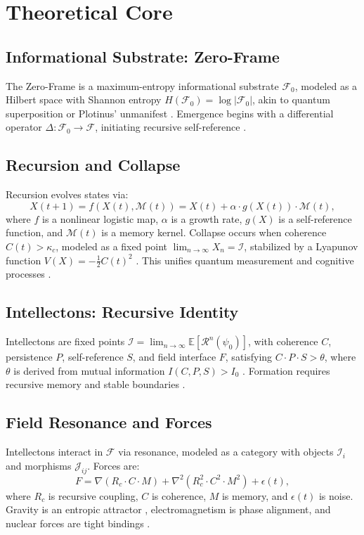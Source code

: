 \documentclass[11pt]{article}
\newcommand{\field}[1]{\mathcal{#1}}
\newcommand{\intellecton}{\mathcal{I}} %
\begin{document}
\section{Theoretical Core}
\label{sec:theory}

\subsection{Informational Substrate: Zero-Frame}
The Zero-Frame is a maximum-entropy informational substrate $\field{F}_0$, modeled as a Hilbert space with Shannon entropy $H(\field{F}_0) = \log |\field{F}_0|$, akin to quantum superposition \citep{zurek2003} or Plotinus' unmanifest \citep{plotinus2020}. Emergence begins with a differential operator $\Delta: \field{F}_0 \to \field{F}$, initiating recursive self-reference \citep{wolfram2020}.

\subsection{Recursion and Collapse}
Recursion evolves states via:
\begin{equation}
X(t+1) = f(X(t), \mathcal{M}(t)) = X(t) + \alpha \cdot g(X(t)) \cdot \mathcal{M}(t),
\label{eq:recursion}
\end{equation}
where $f$ is a nonlinear logistic map, $\alpha$ is a growth rate, $g(X)$ is a self-reference function, and $\mathcal{M}(t)$ is a memory kernel. Collapse occurs when coherence $C(t) > \kappa_c$, modeled as a fixed point $\lim_{n \to \infty} X_n = \intellecton$, stabilized by a Lyapunov function $V(X) = -\frac{1}{2} C(t)^2$ \citep{penrose2024}. This unifies quantum measurement \citep{rovelli2023} and cognitive processes \citep{baars2023}.

\subsection{Intellectons: Recursive Identity}
Intellectons are fixed points $\intellecton = \lim_{n \to \infty} \mathbb{E}[\mathcal{R}^n(\psi_0)]$, with coherence $C$, persistence $P$, self-reference $S$, and field interface $F$, satisfying $C \cdot P \cdot S > \theta$, where $\theta$ is derived from mutual information $I(C,P,S) > I_0$ \citep{tononi2023, levin2024}. Formation requires recursive memory and stable boundaries \citep{hofstadter1979}.

\subsection{Field Resonance and Forces}
Intellectons interact in $\field{F}$ via resonance, modeled as a category with objects $\intellecton_i$ and morphisms $\mathcal{J}_{ij}$. Forces are:
\begin{equation}
F = \nabla (R_c \cdot C \cdot M) + \nabla^2 (R_c^2 \cdot C^2 \cdot M^2) + \epsilon(t),
\label{eq:force}
\end{equation}
where $R_c$ is recursive coupling, $C$ is coherence, $M$ is memory, and $\epsilon(t)$ is noise. Gravity is an entropic attractor \citep{verlinde2023}, electromagnetism is phase alignment, and nuclear forces are tight bindings \citep{susskind2023}.
\end{document}
